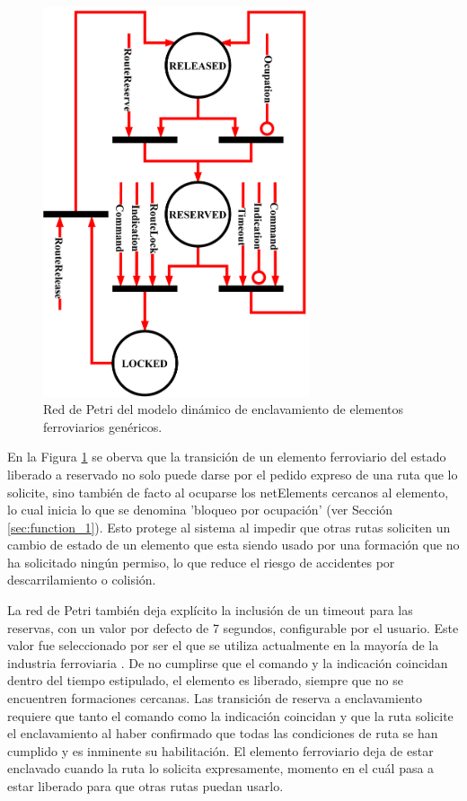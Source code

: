 	\begin{figure}[H]
		\centering
		\includegraphics[width=0.7\textwidth]{Figuras/INT_petri}
		\centering\caption{Red de Petri del modelo dinámico de enclavamiento de elementos ferroviarios genéricos.}
		\label{fig:Interlocking_petri}
	\end{figure}
	
	En la Figura \ref{fig:Interlocking_petri} se oberva que la transición de un elemento ferroviario del estado liberado a reservado no solo puede darse por el pedido expreso de una ruta que lo solicite, sino también de facto al ocuparse los netElements cercanos al elemento, lo cual inicia lo que se denomina 'bloqueo por ocupación' (ver Sección \ref{sec:function_1}). Esto protege al sistema al impedir que otras rutas soliciten un cambio de estado de un elemento que esta siendo usado por una formación que no ha solicitado ningún permiso, lo que reduce el riesgo de accidentes por descarrilamiento o colisión. 
	
	La red de Petri también deja explícito la inclusión de un timeout para las reservas, con un valor por defecto de 7 segundos, configurable por el usuario. Este valor fue seleccionado por ser el que se utiliza actualmente en la mayoría de la industria ferroviaria \cite{ARTC}. De no cumplirse que el comando y la indicación coincidan dentro del tiempo estipulado, el elemento es liberado, siempre que no se encuentren formaciones cercanas. Las transición de reserva a enclavamiento requiere que tanto el comando como la indicación coincidan y que la ruta solicite el enclavamiento al haber confirmado que todas las condiciones de ruta se han cumplido y es inminente su habilitación. El elemento ferroviario deja de estar enclavado cuando la ruta lo solicita expresamente, momento en el cuál pasa a estar liberado para que otras rutas puedan usarlo.
	
